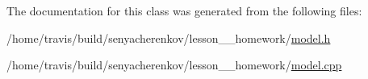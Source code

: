 The documentation for this class was generated from the following files\-:\begin{DoxyCompactItemize}
\item 
/home/travis/build/senyacherenkov/lesson\-\_\-\_\-homework/\hyperlink{model_8h}{model.\-h}\item 
/home/travis/build/senyacherenkov/lesson\-\_\-\_\-homework/\hyperlink{model_8cpp}{model.\-cpp}\end{DoxyCompactItemize}
